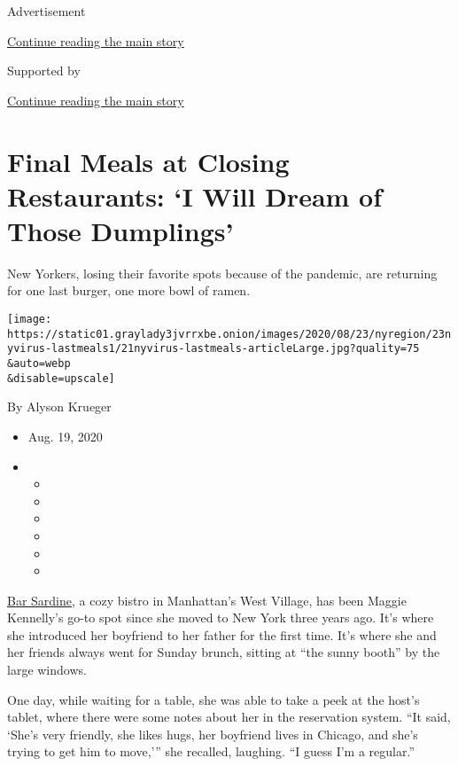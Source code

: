 Advertisement

\protect\hyperlink{after-top}{Continue reading the main story}

Supported by

\protect\hyperlink{after-sponsor}{Continue reading the main story}

\hypertarget{final-meals-at-closing-restaurants-i-will-dream-of-those-dumplings}{%
\section{Final Meals at Closing Restaurants: `I Will Dream of Those
Dumplings'}\label{final-meals-at-closing-restaurants-i-will-dream-of-those-dumplings}}

New Yorkers, losing their favorite spots because of the pandemic, are
returning for one last burger, one more bowl of ramen.

\texttt{[image: https://static01.graylady3jvrrxbe.onion/images/2020/08/23/nyregion/23nyvirus-lastmeals1/21nyvirus-lastmeals-articleLarge.jpg?quality=75\\\&auto=webp\\\&disable=upscale]}

By Alyson Krueger

\begin{itemize}
\item
  Aug. 19, 2020
\item
  \begin{itemize}
  \item
  \item
  \item
  \item
  \item
  \item
  \end{itemize}
\end{itemize}

\href{https://www.barsardinenyc.com/}{Bar Sardine}, a cozy bistro in
Manhattan's West Village, has been Maggie Kennelly's go-to spot since
she moved to New York three years ago. It's where she introduced her
boyfriend to her father for the first time. It's where she and her
friends always went for Sunday brunch, sitting at ``the sunny booth'' by
the large windows.

One day, while waiting for a table, she was able to take a peek at the
host's tablet, where there were some notes about her in the reservation
system. ``It said, `She's very friendly, she likes hugs, her boyfriend
lives in Chicago, and she's trying to get him to move,''' she recalled,
laughing. ``I guess I'm a regular.''

